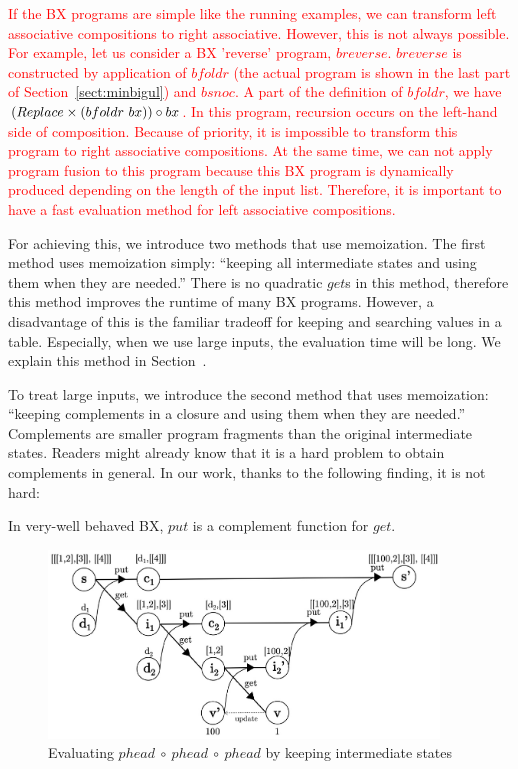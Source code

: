 \textcolor{red}{If the BX programs are simple like the running examples, we can transform left associative compositions to right associative. However, this is not always possible. For example, let us consider a BX 'reverse' program, $breverse$. $breverse$ is constructed by application of $bfoldr$ (the actual program is shown in the last part of Section~\ref{sect:minbigul}) and $bsnoc$.
A part of the definition of $bfoldr$, we have $(Replace \times (bfoldr \ bx)) \circ bx$. In this program, recursion occurs on the left-hand side of composition. Because of priority, it is impossible to transform this program to right associative compositions. At the same time, we can not apply program fusion \cite{Wadler:1988:DTP:80099.80104} to this program because this BX program is dynamically produced depending on the length of the input list. Therefore, it is important to have a fast evaluation method for left associative compositions.}


For achieving this, we introduce two methods that use memoization.
The first method uses memoization simply: ``keeping all intermediate states and using them when they are needed.'' There is no quadratic $get$s in this method, therefore this method improves the runtime of many BX programs. However, a disadvantage of this is the familiar tradeoff for keeping and searching values in a table. Especially, when we use large inputs, the evaluation time will be long. We explain this method in Section~\cite{sect:minbigl_m}.

To treat large inputs, we introduce the second method that uses memoization: ``keeping complements in a closure and using them when they are needed.'' Complements are smaller program fragments than the original intermediate states.
Readers might already know that it is a hard problem to obtain complements in general. In our work, thanks to the following finding, it is not hard:

\vspace{2mm}
In very-well behaved \cite{Foster:2007:CBT:1232420.1232424} BX,%
$put$ is a complement function for $get$.
\vspace{2mm}

\begin{figure}[!t]
  \centering
  \includegraphics[height=5cm]{./fig/fig3.eps}
  \caption{Evaluating $phead \ \circ \ phead \ \circ \ phead$ by keeping intermediate states}
  \label{fig:eval-comp-phead-2}
\end{figure}

